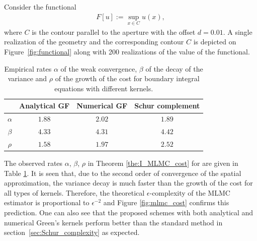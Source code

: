 Consider the functional 
\begin{align}\label{eq:functional}
    F[u]:=\sup_{x \in C} u(x),
\end{align}
where $C$ is the contour parallel to the aperture with the offset $d=0.01$.
A single realization of the geometry and the corresponding contour $C$ is depicted on Figure~\ref{fig:functional} along with 200 realizations of the value of the functional.

\begin{table}[t]
\centering
\begin{tabular}{|c|c|c|c|}
\hline
         & Analytical GF & Numerical GF & Schur complement \\ \hline
$\alpha$ & $1.88$        & $2.02$       & $1.89$           \\
$\beta$  & $4.33$        & $4.31$       & $4.42$           \\
$\rho$ & $1.58$        & $1.97$       & $2.52$           \\ \hline
\end{tabular}
\caption{Empirical rates $\alpha$ of the weak convergence, $\beta$ of the decay of the variance and $\rho$ of the growth of the cost for boundary integral equations with different kernels. }
\label{tab:mlmc_rates}
\end{table}

The observed rates $\alpha$, $\beta$, $\rho$ in Theorem \ref{the:I_MLMC_cost} for  are given in Table \ref{tab:mlmc_rates}.
It is seen that, due to the second order of convergence of the spatial approximation, the variance decay is much faster than the growth of the cost for all types of kernels.
Therefore, the theoretical $\epsilon$-complexity of the MLMC estimator is proportional to $\epsilon^{-2}$ and Figure \ref{fig:mlmc_cost} confirms this prediction. 
One can also see that the proposed schemes with both analytical and numerical Green's kernels perform better than the standard method in section~\ref{sec:Schur_complexity} as expected.





